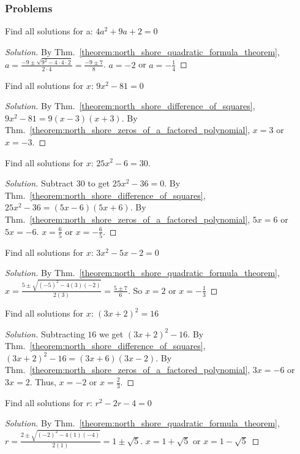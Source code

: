 \documentclass[crop=false,class=book,oneside]{standalone}
\begin{document}
            \subsubsection{Problems}
            \begin{problem}
            Find all solutions for a: $4a^{2}+9a+2=0$
            \end{problem}
            \begin{proof}[Solution]
            By Thm.~\ref{theorem:north_shore_quadratic_formula_theorem}, $a=\frac{-9\pm\sqrt{9^{2}-4\cdot 4\cdot 2}}{2\cdot 4}=\frac{-9\pm 7}{8}$. $a=-2$ or $a=-\frac{1}{4}$
            \end{proof}
            \begin{problem}
            Find all solutions for $x$: $9x^{2}-81=0$
            \end{problem}
            \begin{proof}[Solution]
            By Thm.~\ref{theorem:north_shore_difference_of_squares}, $9x^{2}-81=9(x-3)(x+3)$. By Thm.~\ref{theorem:north_shore_zeros_of_a_factored_polynomial}, $x=3$ or $x=-3$.
            \end{proof}
            \begin{problem}
            Find all solutions for $x$: $25x^{2}-6=30$.
            \end{problem}
            \begin{proof}[Solution]
            Subtract $30$ to get $25x^{2}-36=0$. By Thm.~\ref{theorem:north_shore_difference_of_squares}, $25x^{2}-36 =(5x-6)(5x+6)$. By Thm.~\ref{theorem:north_shore_zeros_of_a_factored_polynomial}, $5x=6$ or $5x=-6$. $x=\frac{6}{5}$ or $x=-\frac{6}{5}$.
            \end{proof}
            \begin{problem}
            Find all solutions for $x$: $3x^{2}-5x-2=0$
            \end{problem}
            \begin{proof}[Solution]
            By Thm.~\ref{theorem:north_shore_quadratic_formula_theorem}, $x=\frac{5\pm\sqrt{(-5)^{2}-4(3)(-2)}}{2(3)}=\frac{5\pm 7}{6}$. So $x=2$ or $x=-\frac{1}{3}$
            \end{proof}
            \begin{problem}
            Find all solutions for $x$: $(3x+2)^{2}=16$
            \end{problem}
            \begin{proof}[Solution]
            Subtracting $16$ we get $(3x+2)^{2}-16$. By Thm.~\ref{theorem:north_shore_difference_of_squares}, $(3x+2)^{2}-16=(3x+6)(3x-2)$. By Thm.~\ref{theorem:north_shore_zeros_of_a_factored_polynomial}, $3x=-6$ or $3x=2$. Thus, $x=-2$ or $x=\frac{2}{3}$.
            \end{proof}
            \begin{problem}
            Find all solutions for $r$: $r^{2}-2r-4=0$
            \end{problem}
            \begin{proof}[Solution]
            By Thm.~\ref{theorem:north_shore_quadratic_formula_theorem}, $r=\frac{2\pm\sqrt{(-2)^{2}-4(1)(-4)}}{2(1)}=1\pm\sqrt{5}$. $x=1+\sqrt{5}$ or $x=1-\sqrt{5}$
            \end{proof}
\end{document}
